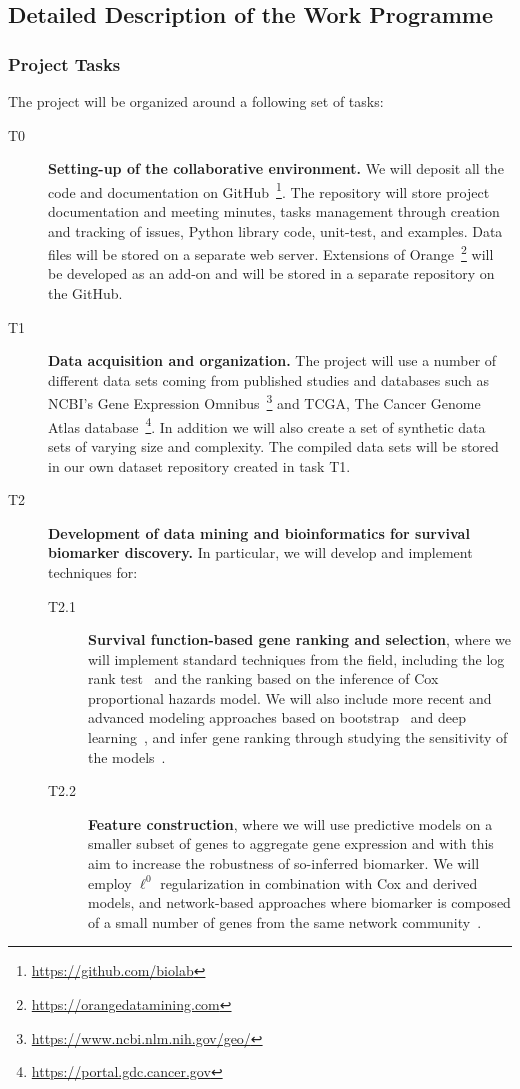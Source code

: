 \documentclass[11pt,a4paper]{article}
\renewcommand{\bold}{\textbf}
\begin{document}
\subsection{Detailed Description of the Work Programme}

\subsubsection{Project Tasks}

The project will be organized around a following set of tasks:
\begin{description}
	\item[T0] \bold{Setting-up of the collaborative environment.} We will deposit all the code and documentation on GitHub~\footnote{\url{https://github.com/biolab}}. The repository will store project documentation and meeting minutes, tasks management through creation and tracking of issues, Python library code, unit-test, and examples. Data files will be stored on a separate web server. Extensions of Orange~\footnote{\url{https://orangedatamining.com}} will be developed as an add-on and will be stored in a separate repository on the GitHub.
	\item[T1] \bold{Data acquisition and organization.} The project will use a number of different data sets coming from published studies and databases such as NCBI's Gene Expression Omnibus~\footnote{\url{https://www.ncbi.nlm.nih.gov/geo/}} and TCGA, The Cancer Genome Atlas database~\footnote{\url{https://portal.gdc.cancer.gov}}. In addition we will also create a set of synthetic data sets of varying size and complexity. The compiled data sets will be stored in our own dataset repository created in task T1.
	\item[T2] \bold{Development of data mining and bioinformatics for survival biomarker discovery.} In particular, we will develop and implement techniques for:
	\begin{description}
		\item[T2.1] \bold{Survival function-based gene ranking and selection}, where we will implement standard techniques from the field, including the log rank test~\cite{} and the ranking based on the inference of Cox proportional hazards model. We will also include more recent and advanced modeling approaches based on bootstrap~\cite{} and deep learning~\cite{}, and infer gene ranking through studying the sensitivity of the models~\cite{}.
		\item[T2.2] \bold{Feature construction}, where we will use predictive models on a smaller subset of genes to aggregate gene expression and with this aim to increase the robustness of so-inferred biomarker. We will employ $\ell^0$ regularization in combination with Cox and derived models, and network-based approaches where biomarker is composed of a small number of genes from the same network community~\cite{}.

\end{description}
\end{description}
\end{document}
